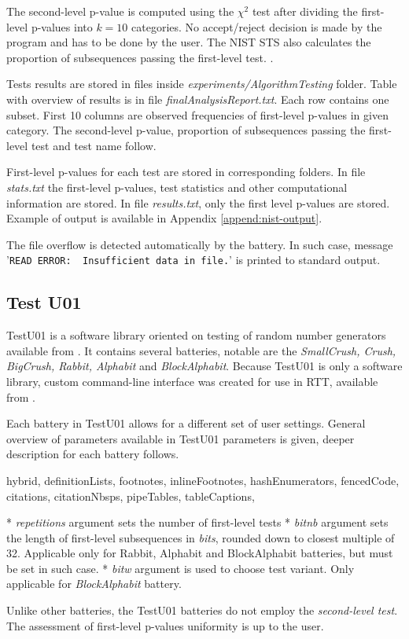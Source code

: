 \documentclass[
  digital,     %
  oneside,     %
  nosansbold,  %
  nocolorbold, %
  nolof,         %
  nolot,         %
]{fithesis4}
\begin{document}
The second-level p-value is computed using the $\chi^2$ test after dividing the first-level p-values into $k=10$ categories. No accept/reject decision is made by the program and has to be done by the user. The NIST STS also calculates the proportion of subsequences passing the first-level test. \cite[p. 4-1]{nist_special}.

Tests results are stored in files inside \emph{experiments/AlgorithmTesting} folder. Table with overview of results is in file \emph{finalAnalysisReport.txt}. Each row contains one subset. First 10 columns are observed frequencies of first-level p-values in given category. The second-level p-value, proportion of subsequences passing the first-level test and test name follow. 

First-level p-values for each test are stored in corresponding folders. In file \emph{stats.txt} the first-level p-values, test statistics and other computational information are stored. In file \emph{results.txt}, only the first level p-values are stored. Example of output is available in Appendix \ref{append:nist-output}.

The file overflow is detected automatically by the battery. In such case, message '\verb|READ ERROR:  Insufficient data in file.|' is printed to standard output.


\subsection{Test U01} \label{chap:sols-testu01}

TestU01 is a software library oriented on testing of random number generators available from \cite{tu01_site}. It contains several batteries, notable are the \emph{SmallCrush, Crush, BigCrush, Rabbit, Alphabit} and \emph{BlockAlphabit}. Because TestU01 is only a software library, custom command-line interface was created for use in RTT, available from \cite{rtt-batteries}.

Each battery in TestU01 allows for a different set of user settings. General overview of parameters available in TestU01 parameters is given, deeper description for each battery follows.
\begin{markdown*}{%
  hybrid,
  definitionLists,
  footnotes,
  inlineFootnotes,
  hashEnumerators,
  fencedCode,
  citations,
  citationNbsps,
  pipeTables,
  tableCaptions,
}

* \emph{repetitions} argument sets the number of first-level tests
* \emph{bit\textunderscore nb} argument sets the length of first-level subsequences in \emph{bits},  rounded down to closest multiple of 32. Applicable only for Rabbit, Alphabit and BlockAlphabit batteries, but must be set in such case.
* \emph{bit\textunderscore w} argument is used to choose test variant. Only applicable for \emph{BlockAlphabit} battery.
\end{markdown*}
Unlike other batteries, the TestU01 batteries do not employ the \emph{second-level test}. The assessment  of first-level p-values uniformity is up to the user. 
\end{document}
